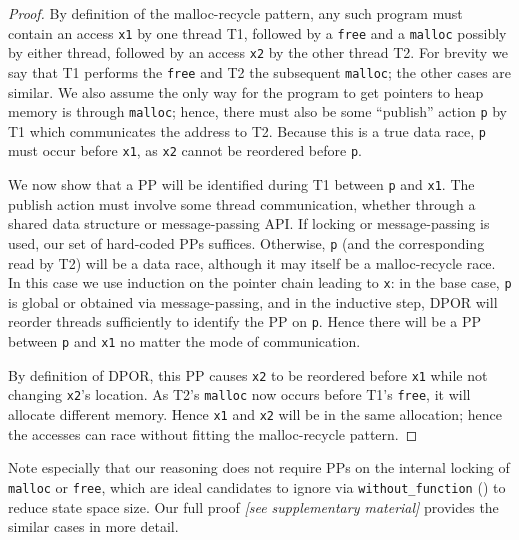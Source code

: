 \begin{proof}
By definition of the malloc-recycle pattern,
any such program must contain an access {\tt x1} by one thread T1,
followed by a {\tt free} and a {\tt malloc} possibly by either thread,
followed by an access {\tt x2} by the other thread T2. %
For brevity we say that T1 performs the {\tt free} and T2 the subsequent {\tt malloc}; the other cases are similar.
We also assume the only way for the program to get pointers to heap memory is through {\tt malloc};
hence, there must also be some ``publish'' action {\tt p} by T1 which communicates the address to T2.
Because this is a true data race, {\tt p} must occur before {\tt x1}, as {\tt x2} cannot be reordered before {\tt p}.

We now show that a PP will be identified during T1 between {\tt p} and {\tt x1}.
The publish action must involve some thread communication, whether through a shared data structure or message-passing API.
If locking or message-passing is used, our set of hard-coded PPs suffices.
Otherwise, {\tt p} (and the corresponding read by T2) will be a data race, although it may itself be a malloc-recycle race.
In this case we use induction on the pointer chain leading to {\tt x}:
in the base case, {\tt p} is global or obtained via message-passing,
and in the inductive step, DPOR will reorder threads sufficiently to identify the PP on {\tt p}.
Hence there will be a PP between {\tt p} and {\tt x1} no matter the mode of communication.

By definition of DPOR, this PP causes {\tt x2} to be reordered before {\tt x1} while not changing {\tt x2}'s location.
As T2's {\tt malloc} now occurs before T1's {\tt free}, it will allocate different memory.
Hence {\tt x1} and {\tt x2} will be in the same allocation;
hence the accesses can race without fitting the malloc-recycle pattern.
\end{proof}

Note especially that our reasoning does not require PPs on the internal locking of {\tt malloc} or {\tt free},
which are ideal candidates to ignore via {\tt without\_function} (\sect{\ref{sec:landslide}}) to reduce state space size.
Our full proof
{\em [see supplementary material]}
provides the similar cases in more detail.
\renewcommand\proofname{Proof}

